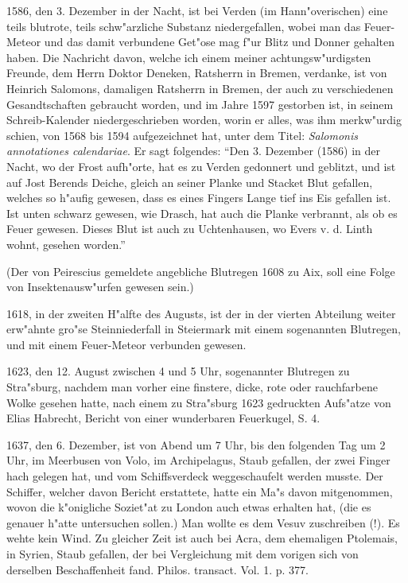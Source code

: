 \documentclass[a4paper, 11pt, oneside, polutonikogreek, german]{article}
\begin{document}
1586, den 3. Dezember in der Nacht, ist bei Verden (im Hann"overischen) eine teils blutrote, teils schw"arzliche Substanz niedergefallen, wobei man das Feuer-Meteor und das damit verbundene Get"ose mag f"ur Blitz und Donner gehalten haben. Die Nachricht davon, welche ich einem meiner achtungsw"urdigsten Freunde, dem Herrn Doktor Deneken, Ratsherrn in Bremen, verdanke, ist von Heinrich Salomons, damaligen Ratsherrn in Bremen, der auch zu verschiedenen Gesandtschaften gebraucht worden, und im Jahre 1597 gestorben ist, in seinem Schreib-Kalender niedergeschrieben worden, worin er alles, was ihm merkw"urdig schien, von 1568 bis 1594 aufgezeichnet hat, unter dem Titel: \emph{Salomonis annotationes calendariae}. Er sagt folgendes: "`Den 3. Dezember (1586) in der Nacht, wo der Frost aufh"orte, hat es zu Verden gedonnert und geblitzt, und ist auf Jost Berends Deiche, gleich an seiner Planke und Stacket Blut gefallen, welches so h"aufig gewesen, dass es eines Fingers Lange tief ins Eis gefallen ist. Ist unten schwarz gewesen, wie Drasch, hat auch die Planke verbrannt, als ob es Feuer gewesen. Dieses Blut ist auch zu Uchtenhausen, wo Evers v. d. Linth wohnt, gesehen worden."'

(Der von Peirescius gemeldete angebliche Blutregen 1608 zu Aix, soll eine Folge von Insektenausw"urfen gewesen sein.)

1618, in der zweiten H"alfte des Augusts, ist der in der vierten Abteilung weiter erw"ahnte gro"se Steinniederfall in Steiermark mit einem sogenannten Blutregen, und mit einem Feuer-Meteor verbunden gewesen.

1623, den 12. August zwischen 4 und 5 Uhr, sogenannter Blutregen zu Stra"sburg, nachdem man vorher eine finstere, dicke, rote oder rauchfarbene Wolke gesehen hatte, nach einem zu Stra"sburg 1623 gedruckten Aufs"atze von Elias Habrecht, Bericht von einer wunderbaren Feuerkugel, S. 4.

1637, den 6. Dezember, ist von Abend um 7 Uhr, bis den folgenden Tag um 2 Uhr, im Meerbusen von Volo, im Archipelagus, Staub gefallen, der zwei Finger hach gelegen hat, und vom Schiffsverdeck weggeschaufelt werden musste. Der Schiffer, welcher davon Bericht erstattete, hatte ein Ma"s davon mitgenommen, wovon die k"onigliche Soziet"at zu London auch etwas erhalten hat, (die es genauer h"atte untersuchen sollen.) Man wollte es dem Vesuv zuschreiben (!). Es wehte kein Wind. Zu gleicher Zeit ist auch bei Acra, dem ehemaligen Ptolemais, in Syrien, Staub gefallen, der bei Vergleichung mit dem vorigen sich von derselben Beschaffenheit fand. Philos. transact. Vol. 1. p. 377.
\end{document}
